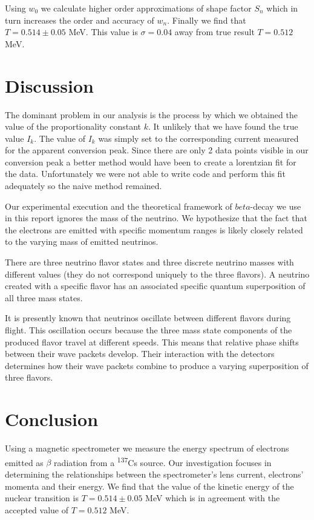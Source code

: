 \documentclass[9pt, a4paper]{article}
\begin{document}
\begin{multicols}{2}
Using $w_0$ we calculate higher order approximations of shape factor $S_n$ which in turn increases the order and accuracy of $w_n$.
Finally we find that $T = 0.514 \pm 0.05$ MeV. This value is $\sigma = 0.04$ away from true result $T = 0.512$ MeV.

\section{Discussion}

The dominant problem in our analysis is the process by which we obtained the value of the proportionality constant $k$. It unlikely that we have found the true value $I_k$. The value of $I_k$ was simply set to the corresponding current measured for the apparent conversion peak. 
Since there are only 2 data points visible in our conversion peak a better method would have been to create a lorentzian fit for the data. Unfortunately we were not able to write code and perform this fit adequately so the naive method remained.

Our experimental execution and the theoretical framework of $beta$-decay we use in this report ignores the mass of the neutrino. We hypothesize that the fact that the electrons are emitted with specific momentum ranges is likely closely related to the varying mass of emitted neutrinos. 

There are three neutrino flavor states and three discrete neutrino masses with different values (they do not correspond uniquely to the three flavors). A neutrino created with a specific flavor has an associated specific quantum superposition of all three mass states\cite{Wikipedia-Neutrino}. 

It is presently known that neutrinos oscillate between different flavors during flight. This oscillation occurs because the three mass state components of the produced flavor travel at different speeds.
This means that relative phase shifts between their wave packets develop. 
Their interaction with the detectors determines how their wave packets combine to produce a varying superposition of three flavors\cite{Wikipedia-Neutrino}. 

\section{Conclusion}

Using a magnetic spectrometer we measure the energy spectrum of electrons emitted as $\beta$ radiation from a \textsuperscript{137}Cs source. Our investigation focuses in determining the relationships between the spectrometer's lens current, electrons' momenta and their energy. We find that the value of the kinetic energy of the nuclear transition is $T = 0.514 \pm 0.05$ MeV which is in agreement with the accepted value of $T = 0.512$ MeV.


\end{multicols}


\end{document}
